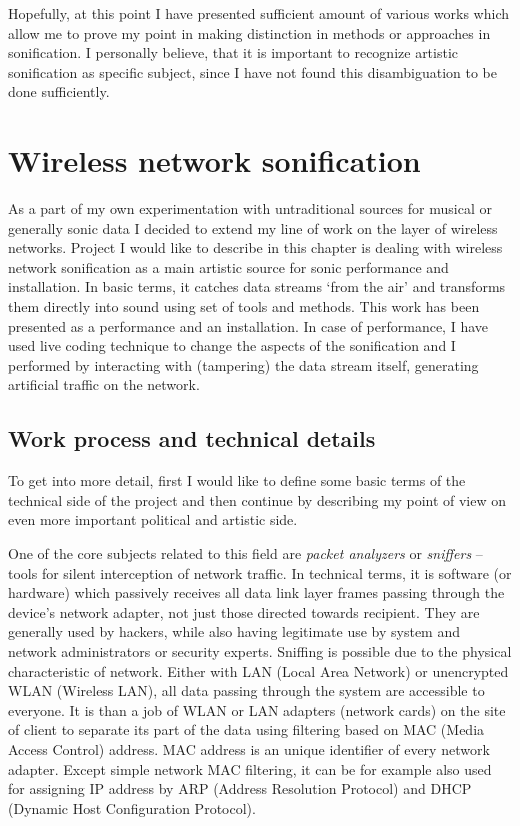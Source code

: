 \documentclass[12pt,a4paper,oneside]{report}
\begin{document}
Hopefully, at this point I have presented sufficient amount of various works which allow me to prove my point in making distinction in methods or approaches in sonification. I personally believe, that it is important to recognize artistic sonification as specific subject, since I have not found this disambiguation to be done sufficiently.

\section{Wireless network sonification}

As a part of my own experimentation with untraditional sources for musical or generally sonic data I decided to extend my line of work on the layer of wireless networks. Project I would like to describe in this chapter is dealing with wireless network sonification as a main artistic source for sonic performance and installation. In basic terms, it catches data streams `from the air' and transforms them directly into sound using set of tools and methods. This work has been presented as a performance and an installation. In case of performance, I have used live coding technique to change the aspects of the sonification and I performed by interacting with (tampering) the data stream itself, generating artificial traffic on the network.

\subsection{Work process and technical details}

To get into more detail, first I would like to define some basic terms of the technical side of the project and then continue by describing my point of view on even more important political and artistic side.

One of the core subjects related to this field are \emph{packet analyzers} or \emph{sniffers} – tools for silent interception of network traffic. In technical terms, it is software (or hardware) which passively receives all data link layer frames passing through the device’s network adapter, not just those directed towards recipient. They are generally used by hackers, while also having legitimate use by system and network administrators or security experts. Sniffing is possible due to the physical characteristic of network. Either with LAN (Local Area Network) or unencrypted WLAN (Wireless LAN), all data passing through the system are accessible to everyone. It is than a job of WLAN or LAN adapters (network cards) on the site of client to separate its part of the data using filtering based on MAC (Media Access Control) address. MAC address is an unique identifier of every network adapter. Except simple network MAC filtering, it can be for example also used for assigning IP address by ARP (Address Resolution Protocol) and DHCP (Dynamic Host Configuration Protocol).
\end{document}
